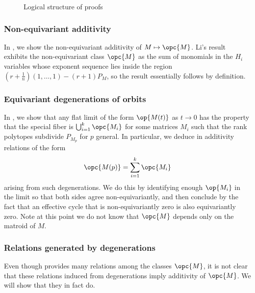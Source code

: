 \documentclass[12pt]{amsart}
\theoremstyle{plain}
\theoremstyle{definition}
\theoremstyle{remark}
\begin{document}
\begin{figure}[h]
\caption{Logical structure of proofs} \label{flow}
\end{figure}

\subsubsection{Non-equivariant additivity}
In , we show the non-equivariant additivity of $M \mapsto \opc{M}$. Li's result \cite{Binglin} exhibits the non-equivariant class $\opc{M}$ as the sum of monomials in the $H_i$ variables whose exponent sequence lies inside the region $(r+\frac{1}{n})(1,\ldots,1)-(r+1)P_M$, so the result essentially follows by definition.

\subsubsection{Equivariant degenerations of orbits} 
\label{degsssection}
In , we show that any flat limit of the form $\op{M(t)}$ as $t \to 0$ has the property that the special fiber is $\bigcup_{i=1}^k \opc{M_i}$ for some matrices $M_i$ such that the rank polytopes subdivide $P_{M_p}$ for $p$ general. In particular, we deduce in  additivity relations of the form
$$\opc{M(p)}=\sum_{i=1}^k \opc{M_i}$$ arising from such degenerations. We do this by identifying enough $\op{M_i}$ in the limit so that both sides agree non-equivariantly, and then conclude by the fact that an effective cycle that is non-equivariantly zero is also equivariantly zero. Note at this point we do not know that $\opc{M}$ depends only on the matroid of $M$.

\subsubsection{Relations generated by degenerations}
Even though  provides many relations among the classes $\opc{M}$, it is not clear that these relations induced from degenerations imply additivity of $\opc{M}$. We will show that they in fact do.
\end{document}
